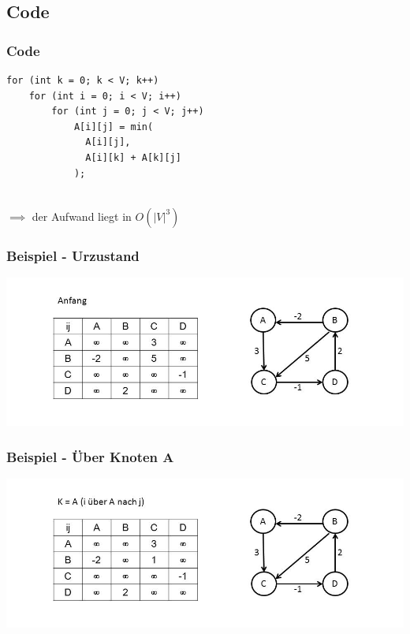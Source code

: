 
\subsection{Code}

\begin{frame}[fragile] %
\frametitle{Code}

\begin{lstlisting}
for (int k = 0; k < V; k++)
    for (int i = 0; i < V; i++)
        for (int j = 0; j < V; j++)
            A[i][j] = min(
              A[i][j],
              A[i][k] + A[k][j]
            );
\end{lstlisting}

~\\$\implies$ der Aufwand liegt in $O(|V|^3)$

\end{frame}


\begin{frame}
\frametitle{Beispiel - Urzustand}

\includegraphics[width=\linewidth]{floyd_warshall_graphs/graph1.JPG}

\end{frame}


\begin{frame}
\frametitle{Beispiel - Über Knoten A}

\includegraphics[width=\linewidth]{floyd_warshall_graphs/graph2.JPG}

\end{frame}

